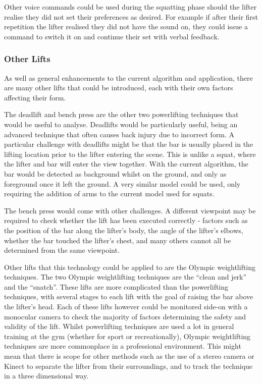 Other voice commands could be used during the squatting phase should the lifter realise they did not set their preferences as desired. For example if after their first repetition the lifter realised they did not have the sound on, they could issue a command to switch it on and continue their set with verbal feedback.

\subsubsection{Other Lifts}

As well as general enhancements to the current algorithm and application, there are many other lifts that could be introduced, each with their own factors affecting their form.

The deadlift and bench press are the other two powerlifting techniques that would be useful to analyse. Deadlifts would be particularly useful, being an advanced technique that often causes back injury due to incorrect form. A particular challenge with deadlifts might be that the bar is usually placed in the lifting location prior to the lifter entering the scene. This is unlike a squat, where the lifter and bar will enter the view together. With the current algorithm, the bar would be detected as background whilst on the ground, and only as foreground once it left the ground. A very similar model could be used, only requiring the addition of arms to the current model used for squats.

The bench press would come with other challenges. A different viewpoint may be required to check whether the lift has been executed correctly - factors such as the position of the bar along the lifter's body, the angle of the lifter's elbows, whether the bar touched the lifter's chest, and many others cannot all be determined from the same viewpoint.

Other lifts that this technology could be applied to are the Olympic weightlifting techniques. The two Olympic weightlifting techniques are the ``clean and jerk'' and the ``snatch''. These lifts are more complicated than the powerlifting techniques, with several stages to each lift with the goal of raising the bar above the lifter's head. Each of these lifts however could be monitored side-on with a monocular camera to check the majority of factors determining the safety and validity of the lift. Whilst powerlifting techniques are used a lot in general training at the gym (whether for sport or recreationally), Olympic weightlifting techniques are more commonplace in a professional environment. This might mean that there is scope for other methods such as the use of a stereo camera or Kinect to separate the lifter from their surroundings, and to track the technique in a three dimensional way. 

